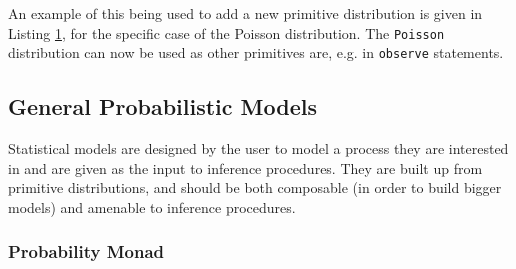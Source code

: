 \documentclass[sigconf]{acmart}
\begin{document}
\begin{figure}[!htb]
  \begin{minipage}{0.5\textwidth}
    \label{lst:prim-sig}
  \end{minipage}
  \begin{minipage}{0.5\textwidth}
    \label{lst:new-dist}
  \end{minipage}
\end{figure}


An example of this being used to add a new primitive distribution is given in Listing \ref{lst:new-dist}, for the specific case of the Poisson distribution. The \texttt{Poisson} distribution can now be used as other primitives are, e.g. in \texttt{observe} statements.


\subsection{General Probabilistic Models}
Statistical models are designed by the user to model a process they are interested in and are given as the input to inference procedures. They are built up from primitive distributions, and should be both composable (in order to build bigger models) and amenable to inference procedures.

\subsubsection{Probability Monad}
\end{document}
